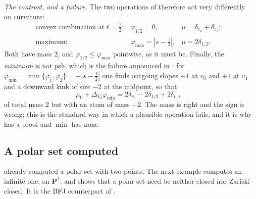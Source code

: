 \begin{example}
\emph{The contrast, and a failure.}  The two operations of
 therefore act very differently on curvature:
\[
 \begin{array}{lll}
  \text{convex combination at }t=\tfrac12:
   &\varphi_{1/2}=0,
   &\mu=\delta_{v_0}+\delta_{v_1};\\[2pt]
  \text{maximum:}
   &\varphi_{\max}=|s-\tfrac12|,
   &\mu=2\delta_{1/2}.
 \end{array}
\]
Both have mass $2$, and $\varphi_{1/2}\leq\varphi_{\max}$ pointwise, as
it must be.  Finally, the \emph{minimum} is not psh, which is the failure
announced in : for
$\varphi_{\min}=\min\{\varphi_1,\varphi_2\}=-|s-\tfrac12|$ one finds
outgoing slopes $+1$ at $v_0$ and $+1$ at $v_1$ and a downward
kink of size $-2$ at the midpoint, so that
\[
 \mu_0+\Delta_{\Gamma_0}\varphi_{\min}
 =2\delta_{v_0}-2\delta_{1/2}+2\delta_{v_1},
\]
of total mass $2$ but with an atom of mass $-2$.  The mass is right and
the sign is wrong; this is the standard way in which a plausible operation
fails, and it is why  has a proof and
$\min$ has none.
\end{example}

\subsection{A polar set computed}
\label{sec:ch21-worked-polar}

 already computed a polar set with two
points.  The next example computes an infinite one, on
$\mathbf P^1$, and shows that a polar set need be neither closed nor
Zariski-closed.  It is the BFJ counterpart of
.

